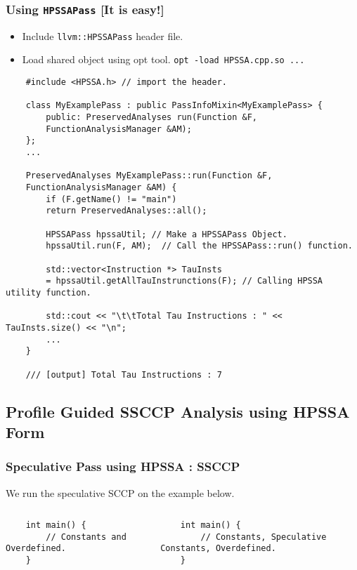 \documentclass[aspectratio=169]{beamer}
\begin{document}
\begin{frame}[fragile]
	\frametitle{Using \texttt{HPSSAPass} [It is easy!]}
	\begin{itemize}
		\item Include \texttt{llvm::HPSSAPass} header file.
		\item Load shared object using opt tool. \texttt{opt -load HPSSA.cpp.so ...} 
	\end{itemize}
	\begin{verbatim}
	#include <HPSSA.h> // import the header.
	
	class MyExamplePass : public PassInfoMixin<MyExamplePass> {
		public: PreservedAnalyses run(Function &F, 
		FunctionAnalysisManager &AM);
	};
	...
	
	PreservedAnalyses MyExamplePass::run(Function &F, 
	FunctionAnalysisManager &AM) {
		if (F.getName() != "main")
		return PreservedAnalyses::all();
		
		HPSSAPass hpssaUtil; // Make a HPSSAPass Object.
		hpssaUtil.run(F, AM);  // Call the HPSSAPass::run() function.
		
		std::vector<Instruction *> TauInsts 
		= hpssaUtil.getAllTauInstrunctions(F); // Calling HPSSA utility function.
		
		std::cout << "\t\tTotal Tau Instructions : " << TauInsts.size() << "\n";
		...
	}
	
	/// [output] Total Tau Instructions : 7 
	\end{verbatim}
\end{frame}
\subsection{Profile Guided SSCCP Analysis using HPSSA Form}
\begin{frame}[fragile]
	\frametitle{Speculative Pass using HPSSA : SSCCP}
	We run the speculative SCCP on the example below.
	\begin{columns}
		\begin{column}{0.2\textwidth}
			\begin{verbatim}
	int main() {
		// Constants and Overdefined.	
	}
			\end{verbatim}
		\end{column}
		\begin{column}{0.5\textwidth}  
			\begin{verbatim}
	int main() {
		// Constants, Speculative Constants, Overdefined.
	}
		\end{verbatim}
		\end{column}
	\end{columns}
\end{frame}
\end{document}
